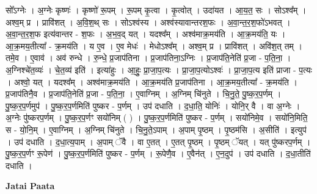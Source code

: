 \documentclass[17pt]{extarticle}
\begin{document}
सो᳚ऽग्नेः । अ॒ग्नेः कृष्णः॑ । कृष्णो॑ रू॒पम् । रू॒पम् कृ॒त्वा । कृ॒त्वोत् । उदा॑यत । आ॒य॒त॒ सः । सोऽश्व᳚म् । अश्व॒म् प्र । प्रावि॑शत् । अ॒वि॒श॒थ् सः । सोऽश्व॑स्य । अश्व॑स्यावान्तरश॒फः । अ॒वा॒न्त॒र॒श॒फो॑ऽभवत् । अ॒वा॒न्त॒र॒श॒फ इत्य॑वान्तर - श॒फः । अ॒भ॒व॒द् यत् । यदश्व᳚म् । अश्व॑माक्र॒मय॑ति । आ॒क्र॒मय॑ति॒ यः । आ॒क्र॒मय॒तीत्या᳚ - क्र॒मय॑ति । य ए॒व । ए॒व मेधः॑ । मेधोऽश्व᳚म् । अश्व॒म् प्र । प्रावि॑शत् । अवि॑श॒त् तम् । तमे॒व । ए॒वाव॑ । अव॑ रुन्धे । रु॒न्धे॒ प्र॒जाप॑तिना । प्र॒जाप॑तिना॒ऽग्निः । प्र॒जाप॑ति॒नेति॑ प्र॒जा - प॒ति॒ना॒ । अ॒ग्निश्चे॑त॒व्यः॑ । चे॒त॒व्य॑ इति॑ । इत्या॑हुः । आ॒हुः॒ प्रा॒जा॒प॒त्यः । प्रा॒जा॒प॒त्योऽश्वः॑ । प्रा॒जा॒प॒त्य इति॑ प्राजा - प॒त्यः । अश्वो॒ यत् । यदश्व᳚म् । अश्व॑माक्र॒मय॑ति । आ॒क्र॒मय॑ति प्र॒जाप॑तिना । आ॒क्र॒मय॒तीत्या᳚ - क्र॒मय॑ति । प्र॒जाप॑तिनै॒व । प्र॒जाप॑ति॒नेति॑ प्र॒जा - प॒ति॒ना॒ । ए॒वाग्निम् । अ॒ग्निम् चि॑नुते । चि॒नु॒ते॒ पु॒ष्क॒र॒प॒र्णम् । पु॒ष्क॒र॒प॒र्णमुप॑ । पु॒ष्क॒र॒प॒र्णमिति॑ पुष्कर - प॒र्णम् । उप॑ दधाति । द॒धा॒ति॒ योनिः॑ । योनि॒र् वै । वा अ॒ग्नेः । अ॒ग्नेः पु॑ष्करप॒र्णम् । पु॒ष्क॒र॒प॒र्णꣳ सयो॑निम् ( ) । पु॒ष्क॒र॒प॒र्णमिति॑ पुष्कर - प॒र्णम् । सयो॑निमे॒व । सयो॑नि॒मिति॒ स - यो॒नि॒म् । ए॒वाग्निम् । अ॒ग्निम् चि॑नुते । चि॒नु॒ते॒ऽपाम् । अ॒पाम् पृ॒ष्ठम् । पृ॒ष्ठम॑सि । अ॒सीति॑ । इत्युप॑ । उप॑ दधाति । द॒धा॒त्य॒पाम् । अ॒पाम् ॅवै । वा ए॒तत् । ए॒तत् पृ॒ष्ठम् । पृ॒ष्ठम् ॅयत् । यत् पु॑ष्करप॒र्णम् । पु॒ष्क॒र॒प॒र्णꣳ रू॒पेण॑ । पु॒ष्क॒र॒प॒र्णमिति॑ पुष्कर - प॒र्णम् । रू॒पेणै॒व । ए॒वैन॑त् । ए॒न॒दुप॑ । उप॑ दधाति । द॒धा॒तीति॑ दधाति । \newline

\textbf{Jatai Paata} \newline
\end{document}
